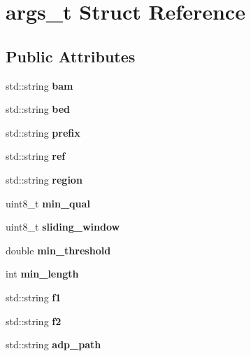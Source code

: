 \hypertarget{structargs__t}{}\section{args\+\_\+t Struct Reference}
\label{structargs__t}
\subsection*{Public Attributes}
\begin{DoxyCompactItemize}
\item 
\mbox{\label{structargs__t_a4a56cd340eee8109492b5b2813bffa68}} 
std\+::string {\bfseries bam}
\item 
\mbox{\label{structargs__t_af0cf1f1dcf2e6bd10b38874e52363ff7}} 
std\+::string {\bfseries bed}
\item 
\mbox{\label{structargs__t_a3df967e3e87023ce97de2db4301b64b6}} 
std\+::string {\bfseries prefix}
\item 
\mbox{\label{structargs__t_a3f2712219c8cafc6d4ebca9a3136febe}} 
std\+::string {\bfseries ref}
\item 
\mbox{\label{structargs__t_a5dc4e74b7f851e7eccb357a8753dd67b}} 
std\+::string {\bfseries region}
\item 
\mbox{\label{structargs__t_acda0278084584a82d4b593c2fc5a7dd1}} 
uint8\+\_\+t {\bfseries min\+\_\+qual}
\item 
\mbox{\label{structargs__t_a34784c067b84338504bd616a8796e82c}} 
uint8\+\_\+t {\bfseries sliding\+\_\+window}
\item 
\mbox{\label{structargs__t_a2ba7423a36d54197ddae057ee93e28c9}} 
double {\bfseries min\+\_\+threshold}
\item 
\mbox{\label{structargs__t_a0ff7dd94de09d68a202076142c8b0b05}} 
int {\bfseries min\+\_\+length}
\item 
\mbox{\label{structargs__t_a8faaa14c7ba16976ecbd04d3879bbfe7}} 
std\+::string {\bfseries f1}
\item 
\mbox{\label{structargs__t_ad47eebe1750174da6bba676d31d0c79e}} 
std\+::string {\bfseries f2}
\item 
\mbox{\label{structargs__t_a8eef0ae6cd79d1d62f77fb8398d1e7a3}} 
std\+::string {\bfseries adp\+\_\+path}
\end{DoxyCompactItemize}


